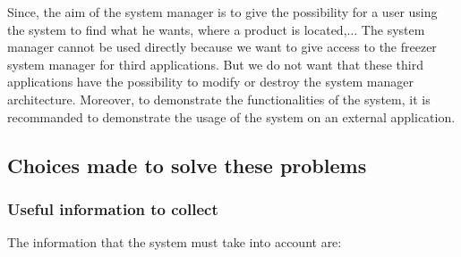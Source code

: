 Since, the aim of the system manager is to give the possibility for a user using the system to find what he wants, where a product is located,... The system manager cannot be used directly because we want to give access to the freezer system manager for third applications. But we do not want that these third applications have the possibility to modify or destroy the system manager architecture. Moreover, to demonstrate the functionalities of the system, it is recommanded to demonstrate the usage of the system on an external application.\\

\subsection{Choices made to solve these problems}
\subsubsection{Useful information to collect}
The information that the system must take into account are:
